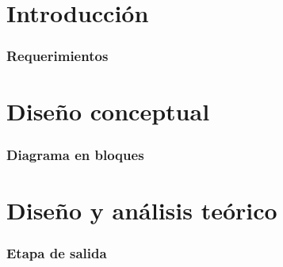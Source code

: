 \documentclass[10pt,a4paper]{article}
\begin{document}
		
	\setcounter{page}{1}

	\part{Introducción}\label{part:intro}


		\section{Requerimientos}\label{sec:req}
			

	\part{Diseño conceptual}\label{part:concept}
%
%			
%
		\section{Diagrama en bloques}\label{sec:bloques}
			
%
%			
	\pagebreak
	\part{Diseño y análisis teórico}\label{part:teo}

		\section{Etapa de salida}
			
\end{document}
